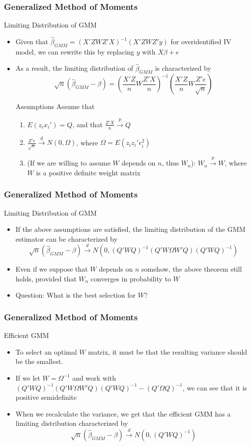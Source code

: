 \documentclass{beamer}
\begin{document}
\begin{frame}
\frametitle{Generalized Method of Moments}
Limiting Distribution of GMM
\begin{itemize}
\item  Given  that $\hat{\beta}_{GMM}=(X'ZWZ'X)^{-1}(X'ZWZ'y)$ for overidentified IV model, we can rewrite this by replacing $y$ with $X\beta+e$
\item As a result, the limiting distribution of $\hat{\beta}_{GMM}$ is characterized by
\[
\sqrt{n}(\hat{\beta}_{GMM}-\beta)=\left(\frac{X'Z}{n}W\frac{Z'X}{n}\right)^{-1}\left(\frac{X'Z}{n}W\frac{Z'e}{\sqrt{n}}\right)
\]
\begin{block}{Assumptions}
Assume that
\begin{enumerate}
\item $E(z_ix_i')=Q$, and that $\frac{Z'X}{n}\xrightarrow{p}Q$
\item $\frac{Z'e}{\sqrt{n}}\xrightarrow{d}N(0,\Omega)$, where $\Omega = E(z_iz_i'e_i^2)$
\item (If we are willing to assume $W$ depends on $n$, thus $W_n$): $W_n\xrightarrow{p}W$, where $W$ is a positive definite weight matrix
\end{enumerate}
\end{block}
\end{itemize}
\end{frame}

\begin{frame}
\frametitle{Generalized Method of Moments}
Limiting Distribution of GMM
\begin{itemize}
\item  If the above assumptions are satisfied, the limiting distribution of the GMM estimator can be characterized by
\[
\sqrt{n}(\hat{\beta}_{GMM}-\beta)\xrightarrow{d}N(0,(Q'WQ)^{-1}(Q'W\Omega W'Q)(Q'WQ)^{-1})
\]
\item Even if we suppose that $W$ depends on $n$ somehow, the above theorem still holds, provided that $W_n$ converges in probability to $W$
\item Question: What is the best selection for $W$?
\end{itemize}
\end{frame}

\begin{frame}
\frametitle{Generalized Method of Moments}
Efficient GMM
\begin{itemize}
\item  To select an optimal $W$ matrix, it must be that the resulting variance should be the smallest. 
\item If we let $W=\Omega^{-1}$ and work with $(Q'WQ)^{-1}(Q'W\Omega W'Q)(Q'WQ)^{-1}-(Q'\Omega Q)^{-1}$, we can see that it is positive semidefinite
\item When we recalculate the variance, we get that the efficient GMM has a limiting distribution characterized by
\[
\sqrt{n}(\hat{\beta}_{GMM}-\beta)\xrightarrow{d}N(0,(Q'WQ)^{-1})
\]\par
\end{itemize}
\end{frame}
\end{document}
